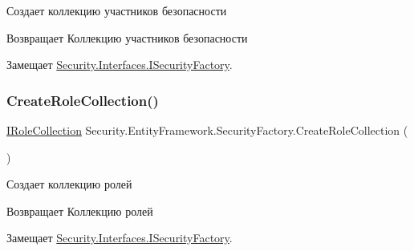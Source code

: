 Создает коллекцию участников безопасности 

\begin{DoxyReturn}{Возвращает}
Коллекцию участников безопасности
\end{DoxyReturn}


Замещает \hyperlink{interface_security_1_1_interfaces_1_1_i_security_factory_af51be7d74fbdd43fe5970ab28359ef2a}{Security.\+Interfaces.\+I\+Security\+Factory}.

\mbox{\label{class_security_1_1_entity_framework_1_1_security_factory_aec7cc1f83c7aed01e98f853a5ddf618e}} 
\subsubsection{\texorpdfstring{Create\+Role\+Collection()}{CreateRoleCollection()}}
{\footnotesize\ttfamily \hyperlink{interface_security_1_1_interfaces_1_1_collections_1_1_i_role_collection}{I\+Role\+Collection} Security.\+Entity\+Framework.\+Security\+Factory.\+Create\+Role\+Collection (\begin{DoxyParamCaption}{ }\end{DoxyParamCaption})}



Создает коллекцию ролей 

\begin{DoxyReturn}{Возвращает}
Коллекцию ролей
\end{DoxyReturn}


Замещает \hyperlink{interface_security_1_1_interfaces_1_1_i_security_factory_a7c007d1bc58724fb8a546ac67a4ad649}{Security.\+Interfaces.\+I\+Security\+Factory}.

\mbox{\label{class_security_1_1_entity_framework_1_1_security_factory_a6b5b70d573343faaf80fe95ff0e52ced}} 
